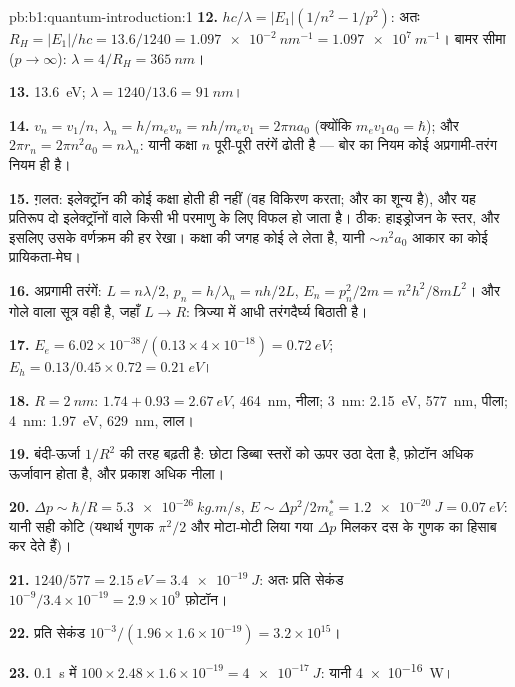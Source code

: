 \begin{solution}{pb:b1:quantum-introduction:1}
\textbf{12.} $hc/\lambda = |E_1|(1/n^2 - 1/p^2)$: अतः $R_H = |E_1|/hc = 13.6/1240 =
\qty{1.097e-2}{nm^{-1}} = \qty{1.097e7}{m^{-1}}$। बामर सीमा ($p \to \infty$):
$\lambda = 4/R_H = \qty{365}{nm}$।

\textbf{13.} \qty{13.6}{eV}; $\lambda = 1240/13.6 = \qty{91}{nm}$।

\textbf{14.} $v_n = v_1/n$, $\lambda_n = h/m_ev_n = nh/m_ev_1 = 2\pi na_0$ (क्योंकि $m_ev_1a_0
= \hbar$); और $2\pi r_n = 2\pi n^2a_0 = n\lambda_n$: यानी कक्षा $n$ पूरी-पूरी
तरंगें ढोती है --- बोर का नियम कोई अप्रगामी-तरंग नियम ही है।

\textbf{15.} ग़लत: इलेक्ट्रॉन की कोई कक्षा होती ही नहीं (वह विकिरण करता; और
 का  शून्य है), और यह प्रतिरूप दो इलेक्ट्रॉनों वाले
किसी भी परमाणु के लिए विफल हो जाता है। ठीक: हाइड्रोजन के स्तर, और इसलिए
उसके वर्णक्रम की हर रेखा। कक्षा की जगह कोई  ले लेता है, यानी
$\sim n^2a_0$ आकार का कोई प्रायिकता-मेघ।

\textbf{16.} अप्रगामी तरंगें: $L = n\lambda/2$, $p_n = h/\lambda_n = nh/2L$, $E_n =
p_n^2/2m = n^2h^2/8mL^2$। और गोले वाला सूत्र वही है, जहाँ $L \to R$:
 त्रिज्या में आधी तरंगदैर्घ्य बिठाती है।

\textbf{17.} $E_e = 6.02 \times 10^{-38}/(0.13 \times 4 \times 10^{-18}) = \qty{0.72}{eV}$;
$E_h = 0.13/0.45 \times 0.72 = \qty{0.21}{eV}$।

\textbf{18.} $R = \qty{2}{nm}$: $1.74 + 0.93 = \qty{2.67}{eV}$, \qty{464}{nm}, नीला;
\qty{3}{nm}: \qty{2.15}{eV}, \qty{577}{nm}, पीला; \qty{4}{nm}: \qty{1.97}{eV},
\qty{629}{nm}, लाल।

\textbf{19.} बंदी-ऊर्जा $1/R^2$ की तरह बढ़ती है: छोटा डिब्बा स्तरों को ऊपर
उठा देता है, फ़ोटॉन अधिक ऊर्जावान होता है, और प्रकाश अधिक नीला।

\textbf{20.} $\Delta p \sim \hbar/R = \qty{5.3e-26}{kg.m/s}$, $E \sim \Delta p^2/2m_e^\ast =
\qty{1.2e-20}{J} = \qty{0.07}{eV}$: यानी सही कोटि (यथार्थ गुणक
$\pi^2/2$ और मोटा-मोटी लिया गया $\Delta p$ मिलकर दस के गुणक का हिसाब कर देते हैं)।

\textbf{21.} $1240/577 = \qty{2.15}{eV} = \qty{3.4e-19}{J}$: अतः प्रति सेकंड $10^{-9}/3.4 \times 10^{-19}
= 2.9 \times 10^9$ फ़ोटॉन।

\textbf{22.} प्रति सेकंड $10^{-3}/(1.96 \times 1.6 \times 10^{-19}) = 3.2 \times 10^{15}$।

\textbf{23.} \qty{0.1}{s} में $100 \times 2.48 \times 1.6 \times 10^{-19} = \qty{4e-17}{J}$:
यानी \qty{4e-16}{W}।


\end{solution}
